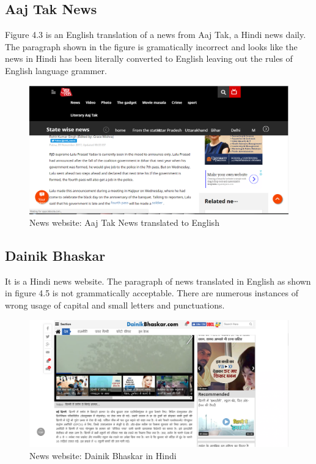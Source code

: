 \documentclass[12pt]{report}
\begin{document}
\subsection{Aaj Tak News}
Figure 4.3 is an English translation of a news from Aaj Tak, a Hindi news daily. The paragraph shown in the figure is gramatically incorrect and looks like the news in Hindi has been literally converted to English leaving out the rules of English language grammer.
 \begin{figure}[ht]
  \centering
  \includegraphics[width=1\textwidth]{Problem6_9/AajTak_News_English.PNG}
  \caption{News website: Aaj Tak News translated to English}
  \label{fig:6}
\end{figure}
\subsection{Dainik Bhaskar}
It is a Hindi news website. The paragraph of news translated in English as shown in figure 4.5 is not grammatically acceptable. There are numerous instances of wrong usage of capital and small letters and punctuations. 
\begin{figure}[ht]
  \centering
  \includegraphics[width=1\textwidth]{Problem6_9/DainikBhaskar_Hindi.PNG}
  \caption{News website: Dainik Bhaskar in Hindi}
  \label{fig:6}
\end{figure}
\end{document}
